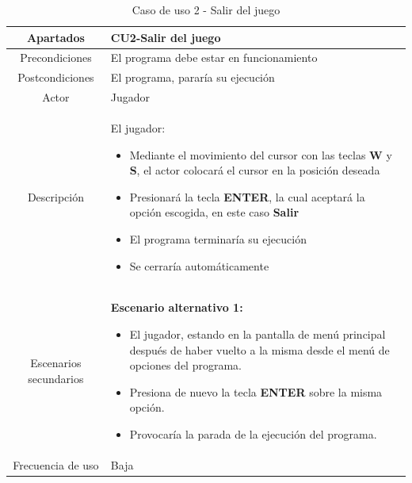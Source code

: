 \documentclass[a4paper]{article}
\begin{document}
\begin{table}[!ht]
    \centering
    \begin{tabular}{|c|p{12cm}|}
        \hline
        \textbf{Apartados}     & \textbf{CU2-Salir del juego}                                                                                \\
        \hline
        Precondiciones         & El programa debe estar en funcionamiento                                                                    \\
        \hline
        Postcondiciones        & El programa, pararía su ejecución                                                                           \\
        \hline
        Actor                  & Jugador                                                                                                     \\
        \hline
        Descripción            & El jugador:
        \begin{itemize}
            \item Mediante el movimiento del cursor con las teclas \textbf{W} y \textbf{S}, el actor colocará el cursor en la posición deseada
            \item Presionará la tecla \textbf{ENTER}, la cual aceptará la opción escogida, en este caso \textbf{Salir}
            \item El programa terminaría su ejecución
            \item Se cerraría automáticamente
        \end{itemize}    \\
        \hline
        Escenarios secundarios & \textbf{Escenario alternativo 1:}
        \begin{itemize}
            \item El jugador, estando en la pantalla de menú principal después de haber vuelto a la misma desde el menú de opciones del programa.
            \item Presiona de nuevo la tecla \textbf{ENTER} sobre la misma opción.
            \item[\faAngleRight] Provocaría la parada de la ejecución del programa.
        \end{itemize} \\
        \hline
        Frecuencia de uso      & Baja                                                                                                        \\
        \hline
    \end{tabular}
    \caption{Caso de uso 2 - Salir del juego}
    \label{tab:casosdeuso2-table}
\end{table}
\end{document}
